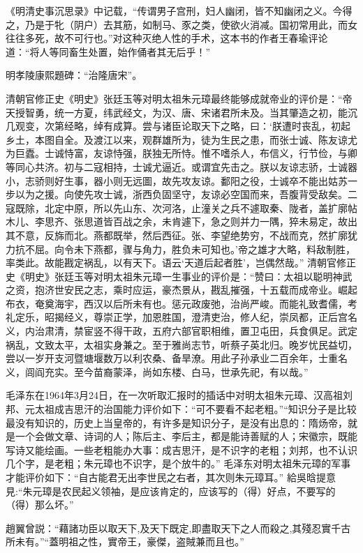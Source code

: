 《明清史事沉思录》中记载，“传谓男子宫刑，妇人幽闭，皆不知幽闭之义。今得之，乃是于牝（阴户）去其筋，如制马、豕之类，使欲火消减。国初常用此，而女往往多死，故不可行也。”对这种灭绝人性的手术，这本书的作者王春瑜评论道：“将人等同畜生处置，始作俑者其无后乎！”

明孝陵康熙題碑：“治隆唐宋”。

清朝官修正史《明史》张廷玉等对明太祖朱元璋最终能够成就帝业的评价是：“帝天授智勇，统一方夏，纬武经文，为汉、唐、宋诸君所未及。当其肇造之初，能沉几观变，次第经略，绰有成算。尝与诸臣论取天下之略，曰：‘朕遭时丧乱，初起乡土，本图自全。及渡江以来，观群雄所为，徒为生民之患，而张士诚、陈友谅尤为巨蠹。士诚恃富，友谅恃强，朕独无所恃。惟不嗜杀人，布信义，行节俭，与卿等同心共济。初与二寇相持，士诚尤逼近。或谓宜先击之。朕以友谅志骄，士诚器小，志骄则好生事，器小则无远圖，故先攻友谅。鄱阳之役，士诚卒不能出姑苏一步以为之援。向使先攻士诚，浙西负固坚守，友谅必空国而来，吾腹背受敌矣。二寇既除，北定中原，所以先山东、次河洛，止潼关之兵不遽取秦、陇者，盖扩廓帖木儿、李思齐、张思道皆百战之余，未肯遽下，急之则并力一隅，猝未易定，故出其不意，反旆而北。燕都既举，然后西征。张、李望绝势穷，不战而克，然扩廓犹力抗不屈。向令未下燕都，骤与角力，胜负未可知也。’帝之雄才大略，料敌制胜，率类此。故能戡定祸乱，以有天下。语云‘天道后起者胜’，岂偶然哉。” 清朝官修正史《明史》张廷玉等对明太祖朱元璋一生事业的评价是：“赞曰：太祖以聪明神武之资，抱济世安民之志，乘时应运，豪杰景从，戡乱摧强，十五载而成帝业。崛起布衣，奄奠海宇，西汉以后所未有也。惩元政废弛，治尚严峻。而能礼致耆儒，考礼定乐，昭揭经义，尊崇正学，加恩胜国，澄清吏治，修人纪，崇凤都，正后宫名义，内治肃清，禁宦竖不得干政，五府六部官职相维，置卫屯田，兵食俱足。武定祸乱，文致太平，太祖实身兼之。至于雅尚志节，听蔡子英北归。晚岁忧民益切，尝以一岁开支河暨塘堰数万以利农桑、备旱潦。用此子孙承业二百余年，士重名义，闾阎充实。至今苗裔蒙泽，尚如东楼、白马，世承先祀，有以哉。”

毛泽东在1964年3月24日，在一次听取汇报时的插话中对明太祖朱元璋、汉高祖刘邦、元太祖成吉思汗的治国能力评价如下：“可不要看不起老粗。”“知识分子是比较最没有知识的，历史上当皇帝的，有许多是知识分子，是没有出息的：隋炀帝，就是一个会做文章、诗词的人；陈后主、李后主，都是能诗善赋的人；宋徽宗，既能写诗又能绘画。一些老粗能办大事：成吉思汗，是不识字的老粗；刘邦，也不认识几个字，是老粗；朱元璋也不识字，是个放牛的。” 毛泽东对明太祖朱元璋的军事才能评价如下：“自古能君无出李世民之右者，其次则朱元璋耳。” 給吳晗提意見:“朱元璋是农民起义领袖，是应该肯定的，应该写的（得）好点，不要写的（得）那么坏。”

趙翼曾説：“藉諸功臣以取天下,及天下既定,即盡取天下之人而殺之,其殘忍實千古所未有。”“蓋明祖之性，實帝王，豪傑，盗賊兼而且也。”

